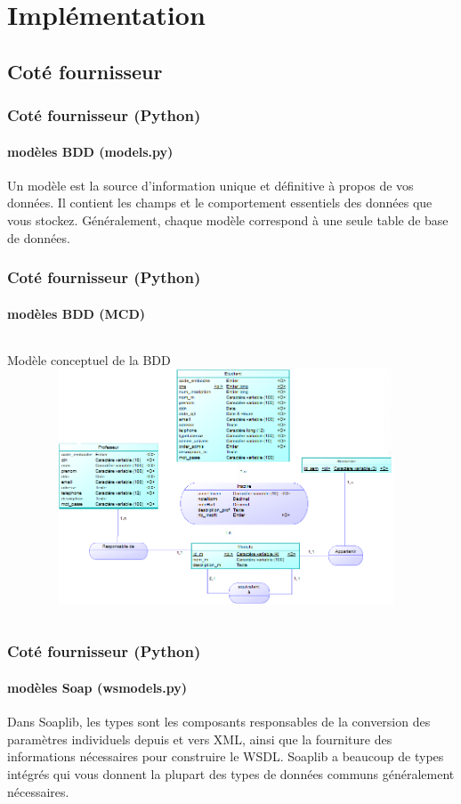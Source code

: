 \section{Implémentation}
\subsection{Coté fournisseur}
\begin{frame}
\frametitle{Coté fournisseur (Python)}
\framesubtitle{modèles BDD (models.py)}
\transsplitverticalout[duration=1.5]
Un modèle est la source d'information unique et définitive à propos de vos données. Il contient les champs et le comportement essentiels des données que vous stockez. Généralement, chaque modèle correspond à une seule table de base de données.
\end{frame}

\begin{frame}
\frametitle{Coté fournisseur (Python)}
\framesubtitle{modèles BDD (MCD)}
\transsplitverticalout[duration=1.5]
\begin{columns}
\begin{column}{13cm}
\begin{alertblock}{Modèle conceptuel de la BDD}
\includegraphics[width=13cm, height=7cm]{images/clientCaptures/mcd.png}
\end{alertblock}
\end{column}
\end{columns}
\end{frame}

\begin{frame}
\frametitle{Coté fournisseur (Python)}
\framesubtitle{modèles Soap (wsmodels.py)}
\transsplitverticalout[duration=1.5]
Dans \textcolor{deepgreen}{Soaplib}, les types sont les composants responsables de la conversion des paramètres individuels depuis et vers \textcolor{deepblue}{XML}, ainsi que la fourniture des informations nécessaires pour construire le \textcolor{deepblue}{WSDL}. \textcolor{deepgreen}{Soaplib} a beaucoup de types intégrés qui vous donnent la plupart des types de données communs généralement nécessaires.
\end{frame}


